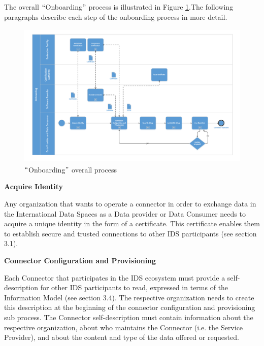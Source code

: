 The overall $``$Onboarding$"$  process is illustrated in Figure \ref{fig:_Overall_onboarding_process}.The following paragraphs describe each step of the onboarding process in more detail.


\begin{figure}[H]
	\begin{Center}
		\includegraphics[width=6.53in,height=2.74in]{./media/image22.PNG}
		\caption{ $``$Onboarding$"$  overall process}
		\label{fig:_Overall_onboarding_process}
	\end{Center}
\end{figure}




\textbf{Acquire Identity}

Any organization that wants to operate a connector in order to exchange data in the International Data Spaces as a Data provider or Data Consumer needs to acquire a unique identity in the form of a certificate. This certificate enables them to establish secure and trusted connections to other IDS participants (see section 3.1).


\textbf{Connector Configuration and Provisioning}

Each Connector that participates in the IDS ecosystem must provide a self-description for other IDS participants to read, expressed in terms of the Information Model (see section 3.4). The respective organization needs to create this description at the beginning of the connector configuration and provisioning sub process. The Connector self-description must contain information about the respective organization, about who maintains the Connector (i.e. the Service Provider), and about the content and type of the data offered or requested.

